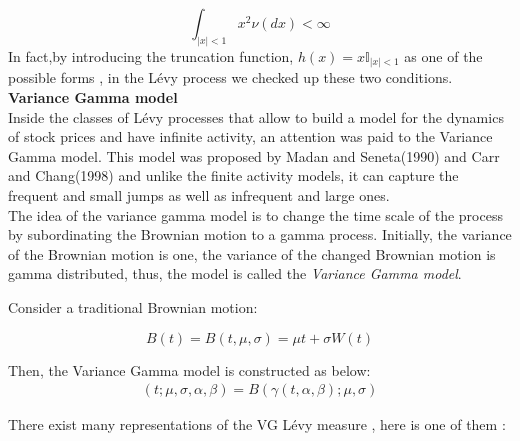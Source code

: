 \documentclass[12pt]{report}
\begin{document}
$$\int_{|x|<1}x^2\nu( dx)< \infty $$
In fact,by introducing the truncation function, $h(x)= x\mathbb{I}_{|x|< 1}$ as one of the possible forms , in the Lévy process we checked up these two conditions.
\\

\large\textbf{Variance Gamma model}\\

Inside the classes of Lévy processes that allow to build a model for the dynamics of stock prices and have infinite activity, an attention was paid to the Variance Gamma model. This model was proposed by Madan and Seneta(1990) and Carr and Chang(1998)  and unlike the finite activity models, it can capture the frequent and small jumps as well as infrequent and large ones.\\

The idea of the variance gamma model is to change the time scale of the process by subordinating the Brownian motion to a gamma process. Initially, the variance of the Brownian motion is one, the variance of the changed Brownian motion is gamma distributed, thus, the model is called the \textit{ Variance Gamma  model}. \\   

Consider a traditional Brownian motion:

\[B(t)=B(t,\mu,\sigma)=\mu t +\sigma W(t)\] 

Then, the Variance Gamma model is constructed as below: 
\begin{gather}
 (t; \mu,\sigma,\alpha,\beta)=B(\gamma(t,\alpha,\beta);\mu,\sigma) 
\end{gather}


There exist many representations of the VG Lévy measure , here is one of them :
\end{document}
